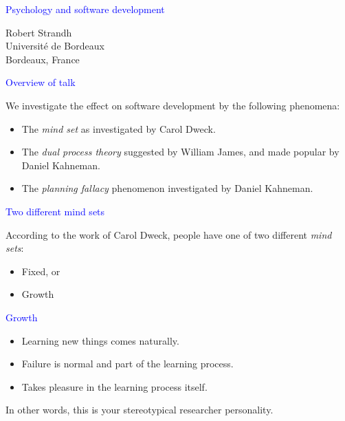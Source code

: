 \documentclass{slides}
\newcommand{\ti}[1]{\begin{center}\Large{\textcolor{blue}{#1}}\end{center}}
\begin{document}
\landscape
\setlength{\oddsidemargin}{1cm}
\setlength{\evensidemargin}{1cm}
\setlength{\marginparwidth}{1cm}
\setlength{\parskip}{0.5cm}
\setlength{\parindent}{0cm}
\begin{slide}\ti{Psychology and software development}
\vskip 0.5cm
\begin{center}
Robert Strandh \\
Université de Bordeaux \\
Bordeaux, France
\end{center}
\vfill\end{slide}
\begin{slide}\ti{Overview of talk}

We investigate the effect on software development by the following
phenomena:

  \begin{itemize}
  \item The \emph{mind set} as investigated by Carol Dweck.
  \item The \emph{dual process theory} suggested by William James, and
    made popular by Daniel Kahneman.
  \item The \emph{planning fallacy} phenomenon investigated by
    Daniel Kahneman.
  \end{itemize}

\vfill\end{slide}
\begin{slide}\ti{Two different mind sets}

According to the work of Carol Dweck, people have one of two different
\emph{mind sets}:

\begin{itemize}
\item Fixed, or
\item Growth
\end{itemize}

\vfill\end{slide}
\begin{slide}\ti{Growth}

  \begin{itemize}
  \item Learning new things comes naturally.
  \item Failure is normal and part of the learning process.
  \item Takes pleasure in the learning process itself.
  \end{itemize}

In other words, this is your stereotypical researcher personality.

\vfill\end{slide}
\end{document}
